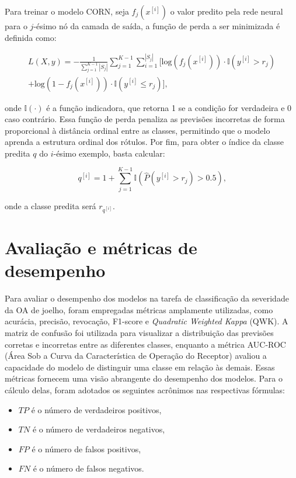 Para treinar o modelo CORN, seja $f_j (x^{[i]})$ o valor predito pela rede neural para o $j$-ésimo nó da camada de saída, a função de perda a ser minimizada é definida como:

\begin{equation}
    \begin{split}
        L(X,y) = -\frac{1}{\sum_{j=1}^{K-1} |S_j|} \sum_{j=1}^{K-1} \sum_{i=1}^{|S_j|} [\text{log}(f_j (x^{[i]})) \cdot \mathbb{I}(y^{[i]} > r_j) \\
        +\text{log}(1 - f_j (x^{[i]})) \cdot \mathbb{I}(y^{[i]} \leq r_j)] \text{,}
    \end{split}
\end{equation}

onde $\mathbb{I}(\cdot)$ é a função indicadora, que retorna 1 se a condição for verdadeira e 0 caso contrário. Essa função de perda penaliza as previsões incorretas de forma proporcional à distância ordinal entre as classes, permitindo que o modelo aprenda a estrutura ordinal dos rótulos. Por fim, para obter o índice da classe predita $q$ do $i$-ésimo exemplo, basta calcular:

\begin{equation}
    q^{[i]} = 1 + \sum_{j=1}^{K-1} \mathbb{I}(\hat{P}(y^{[i]} > r_j) > 0.5) \text{,}
\end{equation}

onde a classe predita será $r_{q^{[i]}}$.

\section{Avaliação e métricas de desempenho} \label{sec:avaliacao-metricas}

Para avaliar o desempenho dos modelos na tarefa de classificação da severidade da OA de joelho, foram empregadas métricas amplamente utilizadas, como acurácia, precisão, revocação, F1-score e \textit{Quadratic Weighted Kappa} (QWK). A matriz de confusão foi utilizada para visualizar a distribuição das previsões corretas e incorretas entre as diferentes classes, enquanto a métrica AUC-ROC (Área Sob a Curva da Característica de Operação do Receptor) avaliou a capacidade do modelo de distinguir uma classe em relação às demais. Essas métricas fornecem uma visão abrangente do desempenho dos modelos. Para o cálculo delas, foram adotados os seguintes acrônimos nas respectivas fórmulas:

\begin{itemize}
    \item $TP$ é o número de verdadeiros positivos,
    \item $TN$ é o número de verdadeiros negativos,
    \item $FP$ é o número de falsos positivos,
    \item $FN$ é o número de falsos negativos.
\end{itemize}

